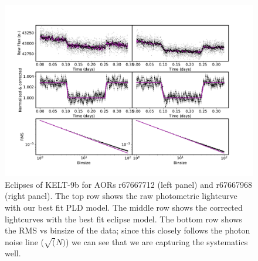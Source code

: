 \begin{subappendices}
\begin{figure}
    \centering
    \includegraphics[width=\linewidth]{Kelt9b_lc.pdf}
    \caption{Eclipses of KELT-9b for AORs r67667712 (left panel) and r67667968 (right panel). The top row shows the raw photometric lightcurve with our best fit PLD model. The middle row shows the corrected lightcurves with the best fit eclipse model. The bottom row shows the RMS vs binsize of the data; since this closely follows the photon noise line ($\sqrt(N)$) we can see that we are capturing the systematics well.}
    \label{P2:fig:kelt9b}
\end{figure}


\end{subappendices}

